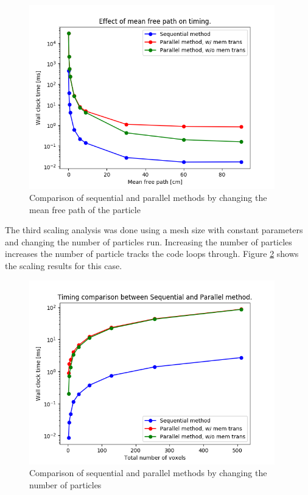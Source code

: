 \begin{figure}[]
 \begin{centering}
 \centering
 \includegraphics[width=0.6\linewidth,height=8cm]{../figs/mean_free_path.png}
 \caption{Comparison of sequential and parallel methods by changing the mean free path of the particle}
 \label{mean_free_path}
 \end{centering}
\end{figure}


The third scaling analysis was done using a mesh size with constant parameters and 
changing the number of particles run. Increasing the number of particles increases the 
number of particle tracks the code loops through. Figure \ref{particles} shows the scaling results for this case. 
\begin{figure}[]
 \begin{centering}
 \centering
 \includegraphics[width=0.6\linewidth,height=8cm]{../figs/particles.png}
 \caption{Comparison of sequential and parallel methods by changing the number of particles}
 \label{particles}
 \end{centering}
\end{figure}

